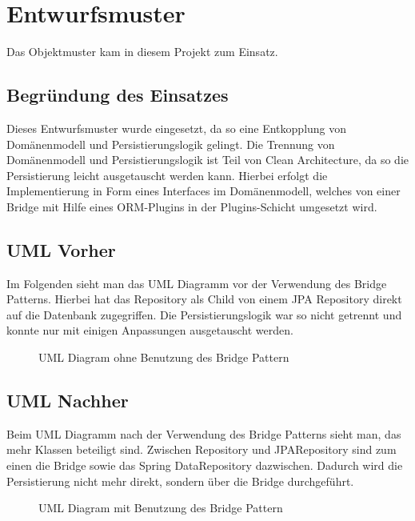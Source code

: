 
\chapter{Entwurfsmuster}
Das Objektmuster  kam in diesem Projekt zum Einsatz. 

\section{Begründung des Einsatzes}
Dieses Entwurfsmuster wurde eingesetzt, da so eine Entkopplung von Domänenmodell und Persistierungslogik gelingt. Die Trennung von Domänenmodell und Persistierungslogik ist Teil von Clean Architecture, da so die Persistierung leicht ausgetauscht werden kann. Hierbei erfolgt die Implementierung in Form eines Interfaces im Domänenmodell, welches von einer Bridge mit Hilfe eines ORM-Plugins in der Plugins-Schicht umgesetzt wird.

\section{\ac{UML} Vorher}
Im Folgenden sieht man das \ac{UML} Diagramm vor der Verwendung des Bridge Patterns. Hierbei hat das Repository als Child von einem JPA Repository direkt auf die Datenbank zugegriffen. Die Persistierungslogik war so nicht getrennt und konnte nur mit einigen Anpassungen ausgetauscht werden.

        \begin{figure}[H]
	        \centering
	        \caption{UML Diagram ohne Benutzung des Bridge Pattern}
        \end{figure}

\section{\ac{UML} Nachher}
Beim \ac{UML} Diagramm nach der Verwendung des Bridge Patterns sieht man, das mehr Klassen beteiligt sind. Zwischen Repository und JPARepository sind zum einen die Bridge sowie das Spring DataRepository dazwischen. Dadurch wird die Persistierung nicht mehr direkt, sondern über die Bridge durchgeführt.

        \begin{figure}[H]
	        \centering
	        \caption{UML Diagram mit Benutzung des Bridge Pattern}
        \end{figure}